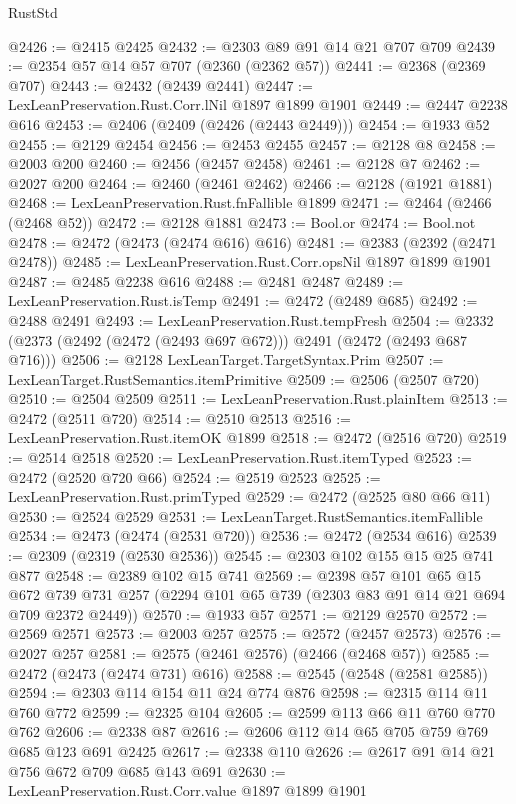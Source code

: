 \begin{lexlean}{RustStd}
\begin{coremodule}
@2426 := @2415 @2425
@2432 := @2303 @89 @91 @14 @21 @707 @709
@2439 := @2354 @57 @14 @57 @707 (@2360 (@2362 @57))
@2441 := @2368 (@2369 @707)
@2443 := @2432 (@2439 @2441)
@2447 := LexLeanPreservation.Rust.Corr.lNil @1897 @1899 @1901
@2449 := @2447 @2238 @616
@2453 := @2406 (@2409 (@2426 (@2443 @2449)))
@2454 := @1933 @52
@2455 := @2129 @2454
@2456 := @2453 @2455
@2457 := @2128 @8
@2458 := @2003 @200
@2460 := @2456 (@2457 @2458)
@2461 := @2128 @7
@2462 := @2027 @200
@2464 := @2460 (@2461 @2462)
@2466 := @2128 (@1921 @1881)
@2468 := LexLeanPreservation.Rust.fnFallible @1899
@2471 := @2464 (@2466 (@2468 @52))
@2472 := @2128 @1881
@2473 := Bool.or
@2474 := Bool.not
@2478 := @2472 (@2473 (@2474 @616) @616)
@2481 := @2383 (@2392 (@2471 @2478))
@2485 := LexLeanPreservation.Rust.Corr.opsNil @1897 @1899 @1901
@2487 := @2485 @2238 @616
@2488 := @2481 @2487
@2489 := LexLeanPreservation.Rust.isTemp
@2491 := @2472 (@2489 @685)
@2492 := @2488 @2491
@2493 := LexLeanPreservation.Rust.tempFresh
@2504 := @2332 (@2373 (@2492 (@2472 (@2493 @697 @672))) @2491 (@2472 (@2493 @687 @716)))
@2506 := @2128 LexLeanTarget.TargetSyntax.Prim
@2507 := LexLeanTarget.RustSemantics.itemPrimitive
@2509 := @2506 (@2507 @720)
@2510 := @2504 @2509
@2511 := LexLeanPreservation.Rust.plainItem
@2513 := @2472 (@2511 @720)
@2514 := @2510 @2513
@2516 := LexLeanPreservation.Rust.itemOK @1899
@2518 := @2472 (@2516 @720)
@2519 := @2514 @2518
@2520 := LexLeanPreservation.Rust.itemTyped
@2523 := @2472 (@2520 @720 @66)
@2524 := @2519 @2523
@2525 := LexLeanPreservation.Rust.primTyped
@2529 := @2472 (@2525 @80 @66 @11)
@2530 := @2524 @2529
@2531 := LexLeanTarget.RustSemantics.itemFallible
@2534 := @2473 (@2474 (@2531 @720))
@2536 := @2472 (@2534 @616)
@2539 := @2309 (@2319 (@2530 @2536))
@2545 := @2303 @102 @155 @15 @25 @741 @877
@2548 := @2389 @102 @15 @741
@2569 := @2398
    @57
    @101
    @65
    @15
    @672
    @739
    @731
    @257
    (@2294 @101 @65 @739 (@2303 @83 @91 @14 @21 @694 @709 @2372 @2449))
@2570 := @1933 @57
@2571 := @2129 @2570
@2572 := @2569 @2571
@2573 := @2003 @257
@2575 := @2572 (@2457 @2573)
@2576 := @2027 @257
@2581 := @2575 (@2461 @2576) (@2466 (@2468 @57))
@2585 := @2472 (@2473 (@2474 @731) @616)
@2588 := @2545 (@2548 (@2581 @2585))
@2594 := @2303 @114 @154 @11 @24 @774 @876
@2598 := @2315 @114 @11 @760 @772
@2599 := @2325 @104
@2605 := @2599 @113 @66 @11 @760 @770 @762
@2606 := @2338 @87
@2616 := @2606 @112 @14 @65 @705 @759 @769 @685 @123 @691 @2425
@2617 := @2338 @110
@2626 := @2617 @91 @14 @21 @756 @672 @709 @685 @143 @691
@2630 := LexLeanPreservation.Rust.Corr.value @1897 @1899 @1901

\end{coremodule}
\end{lexlean}
